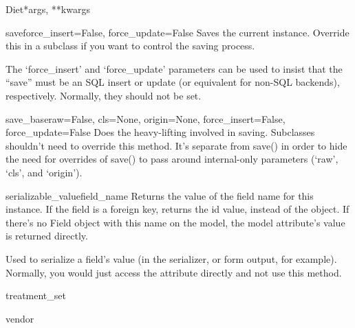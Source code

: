 \documentclass[letterpaper,10pt,english]{sphinxmanual}
\begin{document}
\begin{classdesc}{Diet}{*args, **kwargs}
\hypertarget{data.models.Diet.save}{}\begin{methoddesc}[Diet]{save}{force\_insert=False, force\_update=False}
Saves the current instance. Override this in a subclass if you want to
control the saving process.

The `force\_insert' and `force\_update' parameters can be used to insist
that the ``save'' must be an SQL insert or update (or equivalent for
non-SQL backends), respectively. Normally, they should not be set.
\end{methoddesc}

\hypertarget{data.models.Diet.save_base}{}\begin{methoddesc}[Diet]{save\_base}{raw=False, cls=None, origin=None, force\_insert=False, force\_update=False}
Does the heavy-lifting involved in saving. Subclasses shouldn't need to
override this method. It's separate from save() in order to hide the
need for overrides of save() to pass around internal-only parameters
(`raw', `cls', and `origin').
\end{methoddesc}

\hypertarget{data.models.Diet.serializable_value}{}\begin{methoddesc}[Diet]{serializable\_value}{field\_name}
Returns the value of the field name for this instance. If the field is
a foreign key, returns the id value, instead of the object. If there's
no Field object with this name on the model, the model attribute's
value is returned directly.

Used to serialize a field's value (in the serializer, or form output,
for example). Normally, you would just access the attribute directly
and not use this method.
\end{methoddesc}

\hypertarget{data.models.Diet.treatment_set}{}\begin{memberdesc}[Diet]{treatment\_set}\end{memberdesc}

\hypertarget{data.models.Diet.vendor}{}\begin{memberdesc}[Diet]{vendor}\end{memberdesc}
\end{classdesc}
\end{document}
